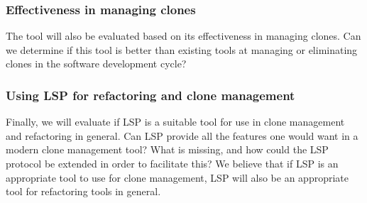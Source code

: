 \documentclass[12pt]{article}
\begin{document}
\subsubsection{Effectiveness in managing clones}

The tool will also be evaluated based on its effectiveness in managing clones. Can we
determine if this tool is better than existing tools at managing or eliminating clones in
the software development cycle?

\subsubsection{Using LSP for refactoring and clone management}

Finally, we will evaluate if LSP is a suitable tool for use in clone management and
refactoring in general. Can LSP provide all the features one would want in a modern clone
management tool? What is missing, and how could the LSP protocol be extended in order to
facilitate this? We believe that if LSP is an appropriate tool to use for clone
management, LSP will also be an appropriate tool for refactoring tools in general.


\newpage


\end{document}
